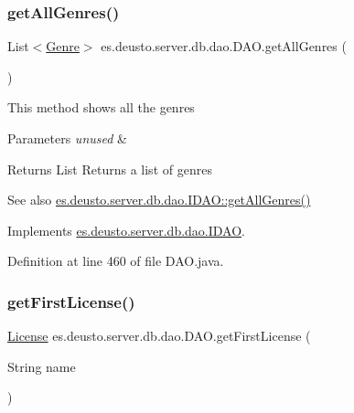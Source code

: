 \subsubsection{\texorpdfstring{get\+All\+Genres()}{getAllGenres()}}
{\footnotesize\ttfamily List$<$\hyperlink{classes_1_1deusto_1_1server_1_1db_1_1data_1_1_genre}{Genre}$>$ es.\+deusto.\+server.\+db.\+dao.\+D\+A\+O.\+get\+All\+Genres (\begin{DoxyParamCaption}{ }\end{DoxyParamCaption})}

This method shows all the genres 
\begin{DoxyParams}{Parameters}
{\em unused} & \\
\hline
\end{DoxyParams}
\begin{DoxyReturn}{Returns}
List Returns a list of genres 
\end{DoxyReturn}
\begin{DoxySeeAlso}{See also}
\hyperlink{interfacees_1_1deusto_1_1server_1_1db_1_1dao_1_1_i_d_a_o_a96ad8de066318847a7828b12befe94f7}{es.\+deusto.\+server.\+db.\+dao.\+I\+D\+A\+O\+::get\+All\+Genres()} 
\end{DoxySeeAlso}


Implements \hyperlink{interfacees_1_1deusto_1_1server_1_1db_1_1dao_1_1_i_d_a_o_a96ad8de066318847a7828b12befe94f7}{es.\+deusto.\+server.\+db.\+dao.\+I\+D\+AO}.



Definition at line 460 of file D\+A\+O.\+java.

\mbox{\label{classes_1_1deusto_1_1server_1_1db_1_1dao_1_1_d_a_o_a4a5a54059bac00ea6f3b6d21f2a31a02}} 
\subsubsection{\texorpdfstring{get\+First\+License()}{getFirstLicense()}}
{\footnotesize\ttfamily \hyperlink{classes_1_1deusto_1_1server_1_1db_1_1data_1_1_license}{License} es.\+deusto.\+server.\+db.\+dao.\+D\+A\+O.\+get\+First\+License (\begin{DoxyParamCaption}\item[{String}]{name }\end{DoxyParamCaption})}

